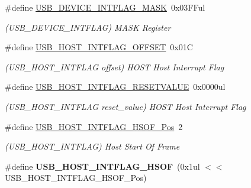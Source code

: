 \begin{DoxyCompactItemize}
\item 
\hypertarget{group___s_a_m_l21___u_s_b_ga29f9aff24b78070a6d708b7c4602b488}{}\#define \hyperlink{group___s_a_m_l21___u_s_b_ga29f9aff24b78070a6d708b7c4602b488}{U\+S\+B\+\_\+\+D\+E\+V\+I\+C\+E\+\_\+\+I\+N\+T\+F\+L\+A\+G\+\_\+\+M\+A\+S\+K}~0x03\+F\+Ful\label{group___s_a_m_l21___u_s_b_ga29f9aff24b78070a6d708b7c4602b488}

\begin{DoxyCompactList}\small\item\em (U\+S\+B\+\_\+\+D\+E\+V\+I\+C\+E\+\_\+\+I\+N\+T\+F\+L\+A\+G) M\+A\+S\+K Register \end{DoxyCompactList}\item 
\hypertarget{group___s_a_m_l21___u_s_b_ga2b6ce6969c3611175cffb2fb05ee9301}{}\#define \hyperlink{group___s_a_m_l21___u_s_b_ga2b6ce6969c3611175cffb2fb05ee9301}{U\+S\+B\+\_\+\+H\+O\+S\+T\+\_\+\+I\+N\+T\+F\+L\+A\+G\+\_\+\+O\+F\+F\+S\+E\+T}~0x01\+C\label{group___s_a_m_l21___u_s_b_ga2b6ce6969c3611175cffb2fb05ee9301}

\begin{DoxyCompactList}\small\item\em (U\+S\+B\+\_\+\+H\+O\+S\+T\+\_\+\+I\+N\+T\+F\+L\+A\+G offset) H\+O\+S\+T Host Interrupt Flag \end{DoxyCompactList}\item 
\hypertarget{group___s_a_m_l21___u_s_b_gaf6d8c82aa14169ff64f737cd593bc118}{}\#define \hyperlink{group___s_a_m_l21___u_s_b_gaf6d8c82aa14169ff64f737cd593bc118}{U\+S\+B\+\_\+\+H\+O\+S\+T\+\_\+\+I\+N\+T\+F\+L\+A\+G\+\_\+\+R\+E\+S\+E\+T\+V\+A\+L\+U\+E}~0x0000ul\label{group___s_a_m_l21___u_s_b_gaf6d8c82aa14169ff64f737cd593bc118}

\begin{DoxyCompactList}\small\item\em (U\+S\+B\+\_\+\+H\+O\+S\+T\+\_\+\+I\+N\+T\+F\+L\+A\+G reset\+\_\+value) H\+O\+S\+T Host Interrupt Flag \end{DoxyCompactList}\item 
\hypertarget{group___s_a_m_l21___u_s_b_ga757cd483097af42da10eebd928894607}{}\#define \hyperlink{group___s_a_m_l21___u_s_b_ga757cd483097af42da10eebd928894607}{U\+S\+B\+\_\+\+H\+O\+S\+T\+\_\+\+I\+N\+T\+F\+L\+A\+G\+\_\+\+H\+S\+O\+F\+\_\+\+Pos}~2\label{group___s_a_m_l21___u_s_b_ga757cd483097af42da10eebd928894607}

\begin{DoxyCompactList}\small\item\em (U\+S\+B\+\_\+\+H\+O\+S\+T\+\_\+\+I\+N\+T\+F\+L\+A\+G) Host Start Of Frame \end{DoxyCompactList}\item 
\hypertarget{group___s_a_m_l21___u_s_b_gaca7f095582018b037db5ba4a7ee41826}{}\#define {\bfseries U\+S\+B\+\_\+\+H\+O\+S\+T\+\_\+\+I\+N\+T\+F\+L\+A\+G\+\_\+\+H\+S\+O\+F}~(0x1ul $<$$<$ U\+S\+B\+\_\+\+H\+O\+S\+T\+\_\+\+I\+N\+T\+F\+L\+A\+G\+\_\+\+H\+S\+O\+F\+\_\+\+Pos)\label{group___s_a_m_l21___u_s_b_gaca7f095582018b037db5ba4a7ee41826}


\end{DoxyCompactItemize}
